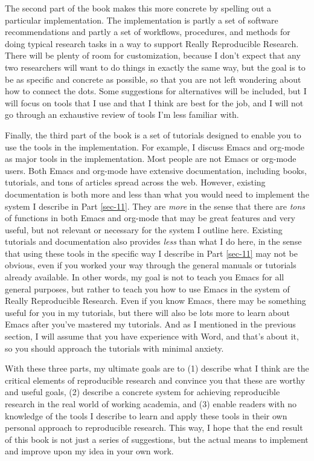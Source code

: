 \documentclass{book}
\begin{document}
The second part of the book makes this more concrete by spelling out a particular implementation.  The implementation is partly a set of software recommendations and partly a set of workflows, procedures, and methods for doing typical research tasks in a way to support Really Reproducible Research.  There will be plenty of room for customization, because I don't expect that any two researchers will want to do things in exactly the same way, but the goal is to be as specific and concrete as possible, so that you are not left wondering about how to connect the dots.  Some suggestions for alternatives will be included, but I will focus on tools that I use and that I think are best for the job, and I will not go through an exhaustive review of tools I'm less familiar with.

Finally, the third part of the book is a set of tutorials designed to enable you to use the tools in the implementation.  For example, I discuss Emacs and org-mode as major tools in the implementation.  Most people are not Emacs or org-mode users.  Both Emacs and org-mode have extensive documentation, including books, tutorials, and tons of articles spread across the web.  However, existing documentation is both more and less than what you would need to implement the system I describe in Part \ref{sec-11}. They are \emph{more} in the sense that there are \emph{tons} of functions in both Emacs and org-mode that may be great features and very useful, but not relevant or necessary for the system I outline here.  Existing tutorials and documentation also provides \emph{less} than what I do here, in the sense that using these tools in the specific way I describe in Part \ref{sec-11} may not be obvious, even if you worked your way through the general manuals or tutorials already available.  In other words, my goal is not to teach you Emacs for all general purposes, but rather to teach you how to use Emacs in the system of Really Reproducible Research.  Even if you know Emacs, there may be something useful for you in my tutorials, but there will also be lots more to learn about Emacs after you've mastered my tutorials. And as I mentioned in the previous section, I will assume that you have experience with Word, and that's about it, so you should approach the tutorials with minimal anxiety.

With these three parts, my ultimate goals are to (1) describe what I think are the critical elements of reproducible research and convince you that these are worthy and useful goals, (2) describe a concrete system for achieving reproducible research in the real world of working academia, and (3) enable readers with no knowledge of the tools I describe to learn and apply these tools in their own personal approach to reproducible research. This way, I hope that the end result of this book is not just a series of suggestions, but the actual means to implement and improve upon my idea in your own work.
\end{document}
